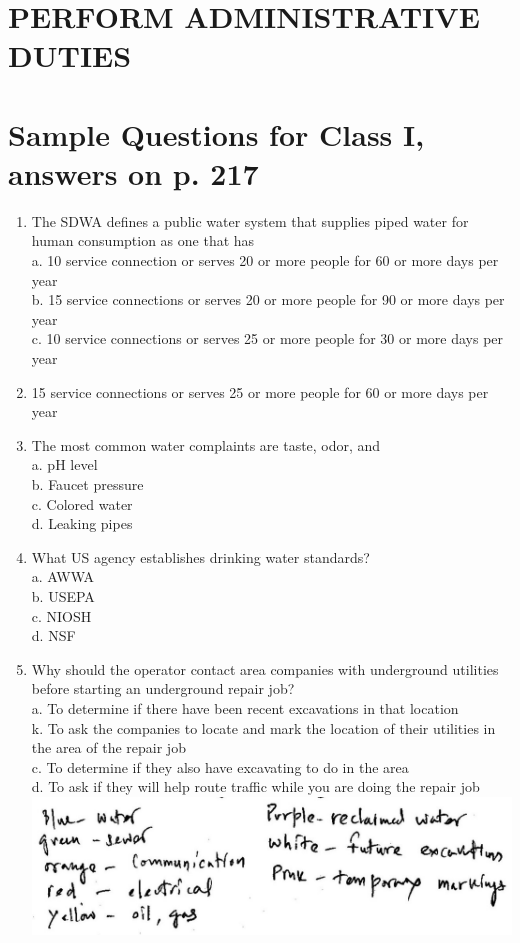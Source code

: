 \documentclass[10pt]{article}
\begin{document}
\section{PERFORM ADMINISTRATIVE DUTIES}
\section{Sample Questions for Class I, answers on p. 217}
\begin{enumerate}
  \item The SDWA defines a public water system that supplies piped water for human consumption as one that has\\
a. 10 service connection or serves 20 or more people for 60 or more days per year\\
b. 15 service connections or serves 20 or more people for 90 or more days per year\\
c. 10 service connections or serves 25 or more people for 30 or more days per year

  \item 15 service connections or serves 25 or more people for 60 or more days per year

  \item The most common water complaints are taste, odor, and\\
a. $\mathrm{pH}$ level\\
b. Faucet pressure\\
c. Colored water\\
d. Leaking pipes

  \item What US agency establishes drinking water standards?\\
a. AWWA\\
b. USEPA\\
c. NIOSH\\
d. NSF

  \item Why should the operator contact area companies with underground utilities before starting an underground repair job?\\
a. To determine if there have been recent excavations in that location\\
k. To ask the companies to locate and mark the location of their utilities in the area of the repair job\\
c. To determine if they also have excavating to do in the area\\
d. To ask if they will help route traffic while you are doing the repair job\\

\includegraphics[max width=\textwidth]{2022_11_11_ca6a6c1a0324ee23e523g-41}

\end{enumerate}
\end{document}
